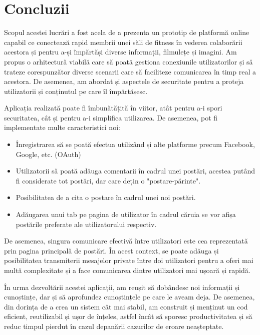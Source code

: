 \chapter{Concluzii}
Scopul acestei lucrări a fost acela de a prezenta un prototip de platformă online capabil ce conectează rapid membrii unei săli de fitness în vederea colaborării acestora și pentru a-și împărtăși diverse informații, filmulețe și imagini.
Am propus o arhitectură viabilă care să poată gestiona conexiunile utilizatorilor și să trateze corespunzător diverse scenarii care să faciliteze comunicarea în timp real a acestora.\newline
De asemenea, am abordat și aspectele de securitate pentru a proteja utilizatorii și conținutul pe care îl împărtășesc.\newline

Aplicația realizată poate fi îmbunătățită în viitor, atât pentru a-i spori securitatea, cât și pentru a-i simplifica utilizarea. De asemenea, pot fi implementate multe caracteristici noi:
\begin{itemize}
	\item{Înregistrarea să se poată efectua utilizând și alte platforme precum Facebook, Google, etc. (OAuth)}
	\item{Utilizatorii să poată adăuga comentarii în cadrul unei postări, acestea putând fi considerate tot postări, dar care dețin o "postare-părinte".}
	\item{Posibilitatea de a cita o postare în cadrul unei noi postări.}
	\item{Adăugarea unui tab pe pagina de utilizator în cadrul căruia se vor afișa postările preferate ale utilizatorului respectiv.}
	\newline
\end{itemize}

De asemenea, singura comunicare efectivă între utilizatori este cea reprezentată prin pagina principală de postări. În acest context, se poate adăuga și posibilitatea transmiterii mesajelor private între doi utilizatori pentru a oferi mai multă complexitate și a face comunicarea dintre utilizatori mai ușoară și rapidă.\newline

În urma dezvoltării acestei aplicații, am reușit să dobândesc noi informații și cunoștințe, dar și să aprofundez cunoștințele pe care le aveam deja. De asemenea, din dorința de a crea un sistem cât mai stabil, am construit și menținut un cod eficient, reutilizabil și ușor de înțeles, astfel încât să sporesc productivitatea și să reduc timpul pierdut în cazul depanării cazurilor de eroare neașteptate.
\label{chap:05}